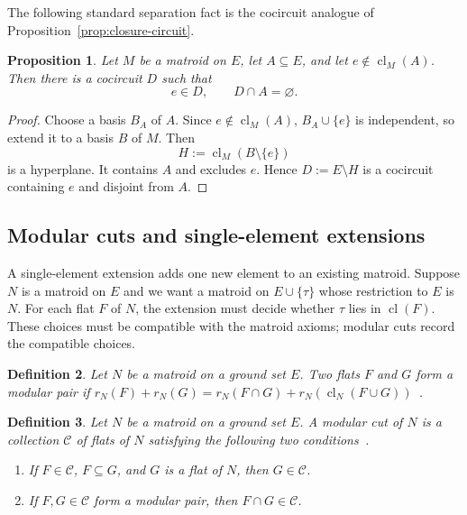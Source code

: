 \documentclass[11pt]{article}
\numberwithin{equation}{section}
\newtheorem{definition}{Definition}[section]
\newtheorem{proposition}[definition]{Proposition}
\theoremstyle{remark}
\newcommand{\cl}{\operatorname{cl}}
\begin{document}
The following standard separation fact is the cocircuit analogue of
Proposition~\ref{prop:closure-circuit}.

\begin{proposition}
\label{prop:cocircuit-separates-closure}
Let $M$ be a matroid on $E$, let $A\subseteq E$, and let
$e\notin\cl_M(A)$. Then there is a cocircuit $D$ such that
\begin{equation}
    e\in D,
    \qquad
    D\cap A=\varnothing.
\end{equation}
\end{proposition}

\begin{proof}
Choose a basis $B_A$ of $A$. Since $e\notin\cl_M(A)$,
$B_A\cup\{e\}$ is independent, so extend it to a basis $B$ of $M$.
Then
\begin{equation}
    H:=\cl_M(B\setminus\{e\})
\end{equation}
is a hyperplane. It contains $A$ and excludes $e$. Hence
$D:=E\setminus H$ is a cocircuit containing $e$ and disjoint from $A$.
\end{proof}

\subsection{Modular cuts and single-element extensions}
\label{subsec:modular-cuts}

A single-element extension adds one new element to an existing matroid. Suppose $N$ is a matroid on $E$ and we want a matroid on $E\cup\{\tau\}$ whose restriction to $E$ is $N$. For each flat $F$ of $N$, the extension must decide whether $\tau$ lies in $\cl(F)$. These choices must be compatible with the matroid axioms; modular cuts record the compatible choices.

\begin{definition}
\label{def:modular-pair}
Let $N$ be a matroid on a ground set $E$. Two flats $F$ and $G$ form a \emph{modular pair} if $r_N(F)+r_N(G)=r_N(F\cap G)+r_N(\cl_N(F\cup G))$~\cite{Crapo1965}.
\end{definition}

\begin{definition}
\label{def:modular-cut}
Let $N$ be a matroid on a ground set $E$. A \emph{modular cut} of $N$ is a collection $\mathcal C$ of flats of $N$ satisfying the following two conditions~\cite{Crapo1965}.
\begin{enumerate}
    \item If $F\in\mathcal C$, $F\subseteq G$, and $G$ is a flat of $N$, then $G\in\mathcal C$.
    \item If $F,G\in\mathcal C$ form a modular pair, then $F\cap G\in\mathcal C$.
\end{enumerate}
\end{definition}
\end{document}
